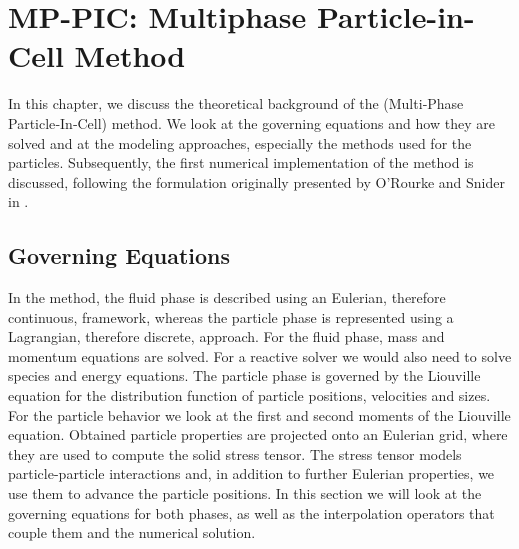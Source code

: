 \pagebreak
\chapter{MP-PIC: Multiphase Particle-in-Cell Method}
\label{ch:MPPIC}
In this chapter, we discuss the theoretical background of the \MP (Multi‑Phase Particle‑In‑Cell) method. We look at the governing equations and how they are solved and at the modeling approaches, especially the methods used for the particles.
Subsequently, the first numerical implementation of the \MP method is discussed, following the formulation originally presented by O'Rourke and Snider in \cite{MPPICFirst}.
 


\section{Governing Equations}
In the \MP method, the fluid phase is described using an Eulerian, therefore continuous, framework, whereas the particle phase is represented using a Lagrangian, therefore discrete, approach. 
For the fluid phase, mass and momentum equations are solved. 
For a reactive solver we would also need to solve species and energy equations.
The particle phase is governed by the Liouville equation for the distribution function of particle positions, velocities and sizes.
For the particle behavior we look at the first and second moments of the Liouville equation.
Obtained particle properties are projected onto an Eulerian grid, where they are used to compute the solid stress tensor.
The stress tensor models particle-particle interactions and, in addition to further Eulerian properties, we use them to advance the particle positions.
In this section we will look at the governing equations for both phases, as well as the interpolation operators that couple them and the numerical solution.
